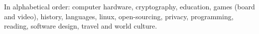 
\inlineheadsection
{In alphabetical order:}
{computer hardware, cryptography, education, games (board and video), history, languages, linux, open-sourcing, privacy, programming, reading, software design, travel and world culture.\\}
